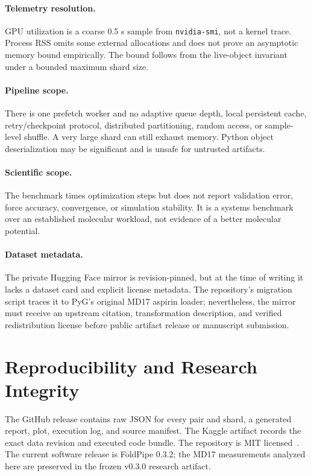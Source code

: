 \documentclass[10pt]{article}
\begin{document}
\paragraph{Telemetry resolution.}
GPU utilization is a coarse 0.5 s sample from \texttt{nvidia-smi}, not a kernel
trace.  Process RSS omits some external allocations and does not prove an
asymptotic memory bound empirically.  The bound follows from the live-object
invariant under a bounded maximum shard size.

\paragraph{Pipeline scope.}
There is one prefetch worker and no adaptive queue depth, local persistent
cache, retry/checkpoint protocol, distributed partitioning, random access, or
sample-level shuffle.  A very large shard can still exhaust memory.  Python
object deserialization may be significant and is unsafe for untrusted
artifacts.

\paragraph{Scientific scope.}
The benchmark times optimization steps but does not report validation error,
force accuracy, convergence, or simulation stability.  It is a systems
benchmark over an established molecular workload, not evidence of a better
molecular potential.

\paragraph{Dataset metadata.}
The private Hugging Face mirror is revision-pinned, but at the time of writing
it lacks a dataset card and explicit license metadata.  The repository's
migration script traces it to PyG's original MD17 aspirin loader; nevertheless,
the mirror must receive an upstream citation, transformation description, and
verified redistribution license before public artifact release or manuscript
submission.

\section{Reproducibility and Research Integrity}

The GitHub release contains raw JSON for every pair and shard, a generated
report, plot, execution log, and source manifest.  The Kaggle artifact records
the exact data revision and executed code bundle.  The repository is MIT
licensed~\cite{khatri2026foldpipe}.  The current software release is FoldPipe
0.3.2; the MD17 measurements analyzed here are preserved in the frozen v0.3.0
research artifact.
\end{document}

